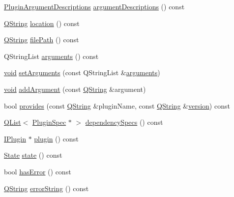 \begin{DoxyCompactItemize}
\item 
\hyperlink{class_extension_system_1_1_plugin_spec_acf81cc5fcc20b047203f9da886cbbdee}{Plugin\-Argument\-Descriptions} \hyperlink{class_extension_system_1_1_plugin_spec_a5591aa7a260c6f74fd5abee3382658af}{argument\-Descriptions} () const 
\item 
\hyperlink{group___u_a_v_objects_plugin_gab9d252f49c333c94a72f97ce3105a32d}{Q\-String} \hyperlink{class_extension_system_1_1_plugin_spec_afa870ca9c67d8e09aa87dc74a5de0ba8}{location} () const 
\item 
\hyperlink{group___u_a_v_objects_plugin_gab9d252f49c333c94a72f97ce3105a32d}{Q\-String} \hyperlink{class_extension_system_1_1_plugin_spec_a9acb85e370ec9ee96c27860dc1ceccd6}{file\-Path} () const 
\item 
Q\-String\-List \hyperlink{class_extension_system_1_1_plugin_spec_a1d67bb71bc40bb5c90eb197503e103b7}{arguments} () const 
\item 
\hyperlink{group___u_a_v_objects_plugin_ga444cf2ff3f0ecbe028adce838d373f5c}{void} \hyperlink{class_extension_system_1_1_plugin_spec_a27d7c6644d5757da46391cc82803e42d}{set\-Arguments} (const Q\-String\-List \&\hyperlink{class_extension_system_1_1_plugin_spec_a1d67bb71bc40bb5c90eb197503e103b7}{arguments})
\item 
\hyperlink{group___u_a_v_objects_plugin_ga444cf2ff3f0ecbe028adce838d373f5c}{void} \hyperlink{class_extension_system_1_1_plugin_spec_a648a51e79049f3a3e0b67596befc8639}{add\-Argument} (const \hyperlink{group___u_a_v_objects_plugin_gab9d252f49c333c94a72f97ce3105a32d}{Q\-String} \&argument)
\item 
bool \hyperlink{class_extension_system_1_1_plugin_spec_a1bc08643fc8637379344949ac8062773}{provides} (const \hyperlink{group___u_a_v_objects_plugin_gab9d252f49c333c94a72f97ce3105a32d}{Q\-String} \&plugin\-Name, const \hyperlink{group___u_a_v_objects_plugin_gab9d252f49c333c94a72f97ce3105a32d}{Q\-String} \&\hyperlink{class_extension_system_1_1_plugin_spec_aa4e3f800e656d5c849a91247fa4a5b71}{version}) const 
\item 
\hyperlink{class_q_list}{Q\-List}$<$ \hyperlink{class_extension_system_1_1_plugin_spec}{Plugin\-Spec} $\ast$ $>$ \hyperlink{class_extension_system_1_1_plugin_spec_aea749392b5e9b90bf580fae85b956e12}{dependency\-Specs} () const 
\item 
\hyperlink{class_extension_system_1_1_i_plugin}{I\-Plugin} $\ast$ \hyperlink{class_extension_system_1_1_plugin_spec_ae6e82e9c2548b309eafbadfffffd4cc6}{plugin} () const 
\item 
\hyperlink{class_extension_system_1_1_plugin_spec_a3d40e1bd1f17eb32b314bcd282b3e3b9}{State} \hyperlink{class_extension_system_1_1_plugin_spec_a2ce7fae71669e79fc1e4a227afee2c78}{state} () const 
\item 
bool \hyperlink{class_extension_system_1_1_plugin_spec_a4f81e50b4662bbe22fe207d66963b712}{has\-Error} () const 
\item 
\hyperlink{group___u_a_v_objects_plugin_gab9d252f49c333c94a72f97ce3105a32d}{Q\-String} \hyperlink{class_extension_system_1_1_plugin_spec_a5c7e05df1ab79d1c67140f72237e92e5}{error\-String} () const 
\end{DoxyCompactItemize}
